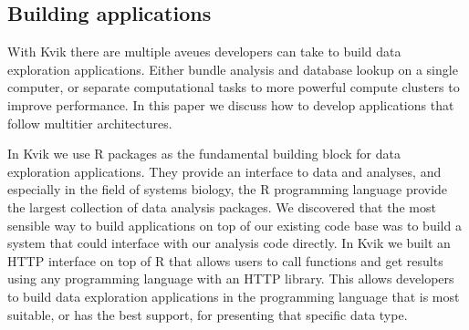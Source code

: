 
\subsection*{Building applications} 
With Kvik there are multiple aveues developers can take to build data
exploration applications. Either bundle analysis and database lookup on a single
computer, or separate computational tasks to more powerful compute clusters to
improve performance. 
In this paper we discuss how to develop applications that follow multitier
architectures. 

In Kvik we use R packages as the fundamental building block for data exploration
applications. They provide an interface to data and analyses, and especially in
the field of systems biology, the R programming language provide the largest
collection of data analysis packages. %
We discovered that the most sensible way to build applications on top of our
existing code base was to build a system that could interface with our analysis
code directly. In Kvik we built an HTTP interface on top of R that allows users
to call functions and get results using any programming language with an HTTP
library. This allows developers to build data exploration applications in the
programming language that is most suitable, or has the best support, for
presenting that specific data type. 



%


